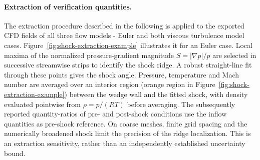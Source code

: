 \paragraph{Extraction of verification quantities.}
The extraction procedure described in the following is applied to the exported CFD fields of all three flow models - Euler and both viscous turbulence model cases. Figure~\ref{fig:shock-extraction-example} illustrates it for an
Euler case. Local maxima of the normalized pressure-gradient magnitude \(S=|\nabla p|/p\) are
selected in successive streamwise strips to identify the shock ridge. A robust
straight-line fit through these points gives the shock angle. Pressure, temperature and Mach number are averaged over an interior region (orange region in Figure~\ref{fig:shock-extraction-example}) between the wedge wall and the fitted shock, with density evaluated pointwise from \(\rho=p/(RT)\) before averaging. The subsequently reported quantity-ratios of pre- and post-shock conditions use the inflow quantities as pre-shock reference. On coarse meshes, finite grid spacing and the numerically broadened shock limit the precision of the ridge localization. This is an extraction
sensitivity, rather than an independently established uncertainty bound.

